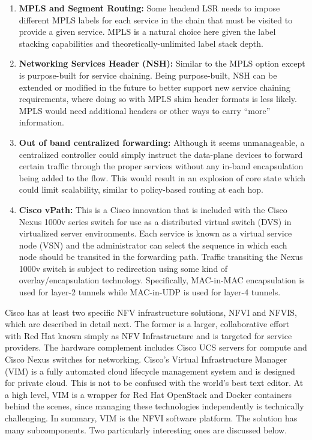 \begin{enumerate}
  \item \textbf{MPLS and Segment Routing:} Some headend LSR needs to impose different
  MPLS labels for each service in the chain that must be visited to provide a
  given service. MPLS is a natural choice here given the label stacking
  capabilities and theoretically-unlimited label stack depth.
  \item \textbf{Networking Services Header (NSH):} Similar to the MPLS option except
  is purpose-built for service chaining. Being purpose-built, NSH can be extended
  or modified in the future to better support new service chaining requirements,
  where doing so with MPLS shim header formats is less likely. MPLS would need
  additional headers or other ways to carry ``more'' information.
  \item \textbf{Out of band centralized forwarding:} Although it seems unmanageable,
  a centralized controller could simply instruct the data-plane devices to forward
  certain traffic through the proper services without any in-band encapsulation
  being added to the flow. This would result in an explosion of core state which
  could limit scalability, similar to policy-based routing at each hop.
  \item \textbf{Cisco vPath:} This is a Cisco innovation that is included with the
  Cisco Nexus 1000v series switch for use as a distributed virtual switch (DVS)
  in virtualized server environments. Each service is known as a virtual service
  node (VSN) and the administrator can select the sequence in which each node
  should be transited in the forwarding path. Traffic transiting the Nexus 1000v
  switch is subject to redirection using some kind of overlay/encapsulation
  technology. Specifically, MAC-in-MAC encapsulation is used for layer-2 tunnels
  while MAC-in-UDP is used for layer-4 tunnels.
\end{enumerate}

Cisco has at least two specific NFV infrastructure solutions, NFVI and NFVIS,
which are described in detail next. The former is a larger, collaborative
effort with Red Hat known simply as NFV Infrastructure and is targeted for
service providers. The hardware complement includes Cisco UCS servers for
compute and Cisco Nexus switches for networking. Cisco's Virtual
Infrastructure Manager (VIM) is a fully automated cloud lifecycle management
system and is designed for private cloud. This is not to be confused with
the world's best text editor. At a high level, VIM is a wrapper
for Red Hat OpenStack and Docker containers behind the scenes, since managing
these technologies independently is technically challenging. In summary, VIM
is the NFVI software platform. The solution has many subcomponents. Two
particularly interesting ones are discussed below.


